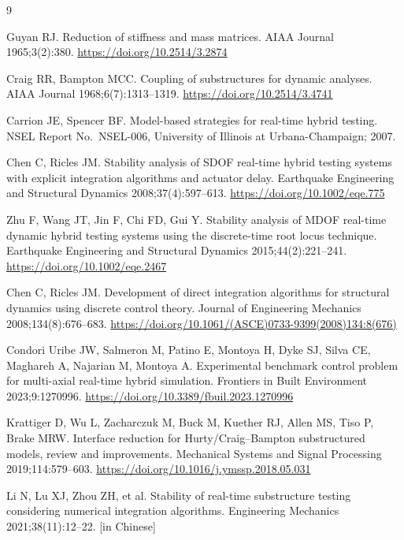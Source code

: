 \documentclass[11pt,a4paper]{article}
\numberwithin{equation}{section}
\begin{document}
\begin{thebibliography}{9}
	
	Guyan RJ. Reduction of stiffness and mass matrices. AIAA Journal 1965;3(2):380. \url{https://doi.org/10.2514/3.2874}
	
	Craig RR, Bampton MCC. Coupling of substructures for dynamic analyses. AIAA Journal 1968;6(7):1313--1319. \url{https://doi.org/10.2514/3.4741}
	
	Carrion JE, Spencer BF. Model-based strategies for real-time hybrid testing. NSEL Report No.\ NSEL-006, University of Illinois at Urbana-Champaign; 2007.
	
	Chen C, Ricles JM. Stability analysis of SDOF real-time hybrid testing systems with explicit integration algorithms and actuator delay. Earthquake Engineering and Structural Dynamics 2008;37(4):597--613. \url{https://doi.org/10.1002/eqe.775}
	
	Zhu F, Wang JT, Jin F, Chi FD, Gui Y. Stability analysis of MDOF real-time dynamic hybrid testing systems using the discrete-time root locus technique. Earthquake Engineering and Structural Dynamics 2015;44(2):221--241. \url{https://doi.org/10.1002/eqe.2467}
	
	Chen C, Ricles JM. Development of direct integration algorithms for structural dynamics using discrete control theory. Journal of Engineering Mechanics 2008;134(8):676--683. \url{https://doi.org/10.1061/(ASCE)0733-9399(2008)134:8(676)}
	
	Condori Uribe JW, Salmeron M, Patino E, Montoya H, Dyke SJ, Silva CE, Maghareh A, Najarian M, Montoya A. Experimental benchmark control problem for multi-axial real-time hybrid simulation. Frontiers in Built Environment 2023;9:1270996. \url{https://doi.org/10.3389/fbuil.2023.1270996}
	
	Krattiger D, Wu L, Zacharczuk M, Buck M, Kuether RJ, Allen MS, Tiso P, Brake MRW. Interface reduction for Hurty/Craig--Bampton substructured models, review and improvements. Mechanical Systems and Signal Processing 2019;114:579--603. \url{https://doi.org/10.1016/j.ymssp.2018.05.031}
	
	Li N, Lu XJ, Zhou ZH, et al. Stability of real-time substructure testing considering numerical integration algorithms. Engineering Mechanics 2021;38(11):12--22. [in Chinese]
	
\end{thebibliography}
\end{document}
